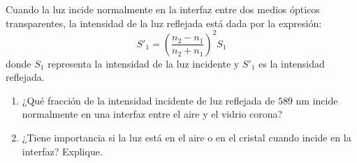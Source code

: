 \item Cuando la luz incide normalmente en la interfaz entre dos medios ópticos transparentes, la intensidad de la luz reflejada está dada por la expresión:
$$ S'_1 = \left( \frac{n_2 - n_1}{n_2 + n_1} \right)^2 S_1 $$
donde $S_1$ representa la intensidad de la luz incidente y $S'_1$ es la intensidad reflejada.
\begin{enumerate}
    \item ¿Qué fracción de la intensidad incidente de luz reflejada de $589\text{ nm}$ incide normalmente en una interfaz entre el aire y el vidrio corona?
    \item ¿Tiene importancia si la luz está en el aire o en el cristal cuando incide en la interfaz? Explique.
\end{enumerate}